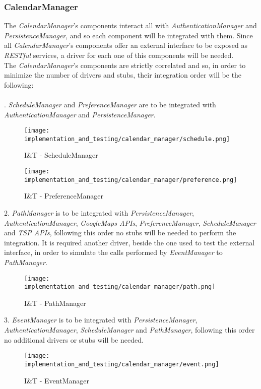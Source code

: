 \subsubsection{CalendarManager}
The \textit{CalendarManager}'s components interact all with \textit{AuthenticationManager} and \textit{PersistenceManager}, and so each component will be integrated with them. Since all \textit{CalendarManager}'s components offer an external interface to be exposed as \textit{RESTful} services, a driver for each one of this components will be needed.\\
The \textit{CalendarManager}'s components are strictly correlated and so, in order to minimize the number of drivers and stubs, their integration order will be the following:\\ \\
. \textit{ScheduleManager} and \textit{PreferenceManager} are to be integrated with \textit{AuthenticationManager} and \textit{PersistenceManager}.
\begin{figure}[H]
	\begin{center}
		\texttt{[image: implementation\_and\_testing/calendar\_manager/schedule.png]}
	\end{center}
	\caption{I\&T - ScheduleManager}
\end{figure}
\begin{figure}[H]
	\begin{center}
		\texttt{[image: implementation\_and\_testing/calendar\_manager/preference.png]}
	\end{center}
	\caption{I\&T - PreferenceManager}
\end{figure}

2. \textit{PathManager} is to be integrated with \textit{PersistenceManager}, \textit{AuthenticationManager}, \textit{GoogleMaps APIs}, \textit{PreferenceManager}, \textit{ScheduleManager} and \textit{TSP APIs}, following this order no stubs will be needed to perform the integration. It is required another driver, beside the one used to test the external interface, in order to simulate the calls performed by \textit{EventManager} to \textit{PathManager}.
\begin{figure}[H]
	\begin{center}
		\texttt{[image: implementation\_and\_testing/calendar\_manager/path.png]}
	\end{center}
	\caption{I\&T - PathManager}
\end{figure}

3. \textit{EventManager} is to be integrated with \textit{PersistenceManager}, \textit{AuthenticationManager}, \textit{ScheduleManager} and \textit{PathManager}, following this order no additional drivers or stubs will be needed.
\begin{figure}[H]
	\begin{center}
		\texttt{[image: implementation\_and\_testing/calendar\_manager/event.png]}
	\end{center}
	\caption{I\&T - EventManager}
\end{figure}

